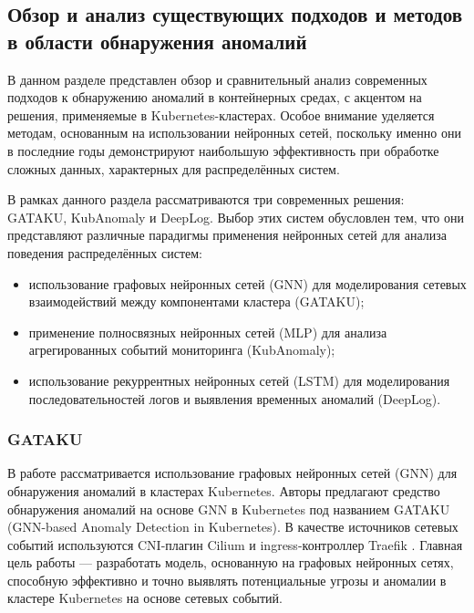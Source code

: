\subsection{Обзор и анализ существующих подходов и методов в области обнаружения аномалий}

В данном разделе представлен обзор и сравнительный анализ современных подходов к обнаружению аномалий в контейнерных средах, с акцентом на решения, применяемые в Kubernetes-кластерах. Особое внимание уделяется методам, основанным на использовании нейронных сетей, поскольку именно они в последние годы демонстрируют наибольшую эффективность при обработке сложных данных, характерных для распределённых систем.

В рамках данного раздела рассматриваются три современных решения: GATAKU, KubAnomaly и DeepLog. Выбор этих систем обусловлен тем, что они представляют различные парадигмы применения нейронных сетей для анализа поведения распределённых систем:

\begin{itemize}
    \item использование графовых нейронных сетей (GNN) для моделирования сетевых взаимодействий между компонентами кластера (GATAKU);
    \item применение полносвязных нейронных сетей (MLP) для анализа агрегированных событий мониторинга (KubAnomaly);
    \item использование рекуррентных нейронных сетей (LSTM) для моделирования последовательностей логов и выявления временных аномалий (DeepLog).
\end{itemize}

\subsubsection{GATAKU}

В работе \cite{Osswald_2025_Anomaly_Detection_Microservices_GNN} рассматривается использование графовых нейронных сетей (GNN) для обнаружения аномалий в кластерах Kubernetes. Авторы предлагают средство обнаружения аномалий на основе GNN в Kubernetes под названием GATAKU (GNN-based Anomaly Detection in Kubernetes). В качестве источников сетевых событий используются CNI-плагин Cilium \cite{cilium} и ingress-контроллер Traefik \cite{Traefik}. Главная цель работы — разработать модель, основанную на графовых нейронных сетях, способную эффективно и точно выявлять потенциальные угрозы и аномалии в кластере Kubernetes на основе сетевых событий.

